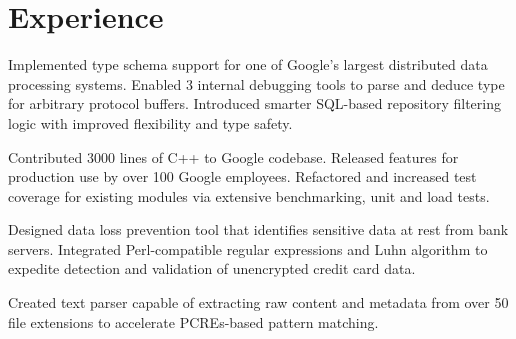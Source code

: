 \documentclass[letterpaper]{deedy-resume} %
\begin{document}
\hfill
%
%
\begin{minipage}[t]{0.66\textwidth} %


\section{Experience}


\vspace{\topsep} %

\sectionspace %



\vspace{\topsep} %
\begin{tightitemize}
\item Implemented type schema support for one of Google's largest distributed data processing systems. Enabled 3 internal debugging tools to parse and deduce type for arbitrary protocol buffers. Introduced smarter SQL-based repository filtering logic with improved flexibility and type safety. 
\item Contributed 3000 lines of C++ to Google codebase. Released features for production use by over 100 Google employees. Refactored and increased test coverage for existing modules via extensive benchmarking, unit and load tests.
\end{tightitemize}

\sectionspace %



\begin{tightitemize}
\item Designed data loss prevention tool that identifies sensitive data at rest from bank servers. Integrated Perl-compatible regular expressions and Luhn algorithm to expedite detection and validation of unencrypted credit card data.
\item Created text parser capable of extracting raw content and metadata from over 50 file extensions to accelerate PCREs-based pattern matching.
\end{tightitemize}


\end{minipage}
\end{document}
